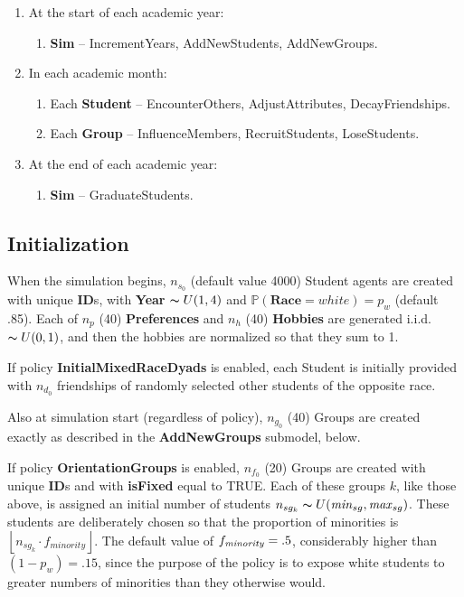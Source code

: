 \begin{enumerate}
\itemsep.1em
\item At the start of each academic year:

    \begin{enumerate}
    \itemsep.1em
    \item \textbf{Sim} -- IncrementYears, AddNewStudents, AddNewGroups.
    \end{enumerate}

\item In each academic month:

    \begin{enumerate}
    \itemsep.1em
    \item Each \textbf{Student} -- EncounterOthers, AdjustAttributes, DecayFriendships. 
    \item Each \textbf{Group} -- InfluenceMembers, RecruitStudents, LoseStudents.
    \end{enumerate}

\item At the end of each academic year:

    \begin{enumerate}
    \itemsep.1em
    \item \textbf{Sim} -- GraduateStudents. %
    \end{enumerate}
\end{enumerate}

\subsection{Initialization}

When the simulation begins, $n_{s_0}$ (default value 4000) Student agents are
created with unique \textbf{ID}s, with \textbf{Year} $\thicksim U(1,4)$
and $\mathbb{P}(\textbf{Race}=white) = p_w$ (default .85). Each of $n_p$ (40)
\textbf{Preferences} and $n_h$ (40) \textbf{Hobbies} are generated i.i.d.
$\thicksim U(0,1)$, and then the hobbies are normalized so that they sum to 1.

If policy \textbf{InitialMixedRaceDyads} is enabled, each Student is initially
provided with $n_{d_0}$ friendships of randomly selected other students of the
opposite race.

Also at simulation start (regardless of policy), $n_{g_0}$ (40) Groups are
created exactly as described in the \textbf{AddNewGroups} submodel, below.

If policy \textbf{OrientationGroups} is enabled, $n_{f_0}$ (20) Groups are
created with unique \textbf{ID}s and with \textbf{isFixed} equal to TRUE. Each
of these groups $k$, like those above, is assigned an initial number of
students $n_{sg_k} \thicksim
U(\text{\textit{min}}_{sg},\text{\textit{max}}_{sg})$. These students are
deliberately chosen so that the proportion of minorities is 
$\left\lfloor n_{sg_k} \cdot f_{\textit{minority}} \right \rfloor$. The default
value of $f_{\text{\textit{minority}}}=.5$,
considerably higher than $(1-p_w)=.15$, since the purpose of the policy is to
expose white students to greater numbers of minorities than they otherwise
would.


